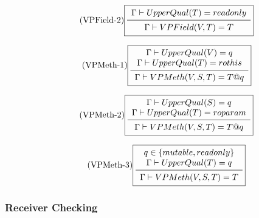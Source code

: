 \vspace{0.4cm}

\begin{equation*}\tag{VPField-2}\label{equ-vpfield-2}
\boxed{
\begin{array}{c}
\Gamma \vdash UpperQual(T) = readonly \\
\midrule
\Gamma \vdash VPField(V,T) = T \\
\end{array}
}
\end{equation*}

\vspace{0.4cm}

\begin{equation*}\tag{VPMeth-1}\label{equ-vpmeth-1}
\boxed{
\begin{array}{c}
\Gamma \vdash UpperQual(V) = q \\
\Gamma \vdash UpperQual(T) = rothis \\
\midrule
\Gamma \vdash VPMeth(V,S,T) = T @ q \\
\end{array}
}
\end{equation*}

\vspace{0.4cm}

\begin{equation*}\tag{VPMeth-2}\label{equ-vpmeth-2}
\boxed{
\begin{array}{c}
\Gamma \vdash UpperQual(S) = q \\
\Gamma \vdash UpperQual(T) = roparam \\
\midrule
\Gamma \vdash VPMeth(V,S,T) = T @ q \\
\end{array}
}
\end{equation*}

\vspace{0.4cm}

\begin{equation*}\tag{VPMeth-3}\label{equ-vpmeth-3}
\boxed{
\begin{array}{c}
q \in \{ mutable, readonly \} \\
\Gamma \vdash UpperQual(T) = q \\
\midrule
\Gamma \vdash VPMeth(V,S,T) = T \\
\end{array}
}
\end{equation*}

\vspace{0.4cm}


\subsubsection{Receiver Checking}


